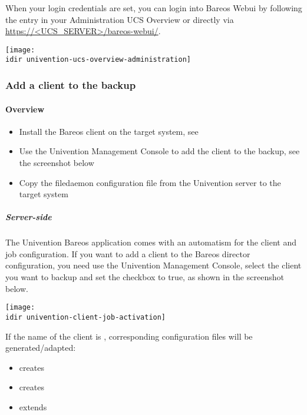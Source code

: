 When your login credentials are set, you can login into Bareos Webui by following the entry in your Administration UCS Overview or directly via \url{https://<UCS_SERVER>/bareos-webui/}.

\begin{center}
  \texttt{[image: \\idir univention-ucs-overview-administration]}
\end{center}



\subsubsection{Add a client to the backup}
\label{sec:UniventionAddClient}

\paragraph{Overview}

  \begin{itemize}
    \item Install the Bareos client on the target system, see 
    \item Use the Univention Management Console to add the client to the backup, see the screenshot below
    \item Copy the filedaemon configuration file from the Univention server to the target system
  \end{itemize}

\subparagraph{Server-side}

The Univention Bareos application comes with an automatism for the client and job configuration. If you want to add a client to the Bareos director configuration, you need use the Univention Management Console, select the client you want to backup and set the  checkbox to true, as shown in the screenshot below.

\begin{center}
  \texttt{[image: \\idir univention-client-job-activation]}
\end{center}

If the name of the client is , corresponding configuration files will be generated/adapted:
\begin{itemize}
  \item creates 
  \item creates 
  \item extends 
\end{itemize}

